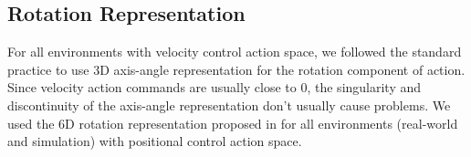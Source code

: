 \documentclass[Afour,sageh,times]{sagej}
\newcommand{\shuran}[1]{\textcolor{MyDarkGreen}{[Shuran: #1]}}
\begin{document}


\subsection{Rotation Representation}
For all environments with velocity control action space, we followed the standard practice \cite{robomimic} to use 3D axis-angle representation for the rotation component of action. Since velocity action commands are usually close to 0, the singularity and discontinuity of the axis-angle representation don't usually cause problems. We used the 6D rotation representation proposed in \citet{zhou2019continuity} for all environments (real-world and simulation) with positional control action space. 
\end{document}
